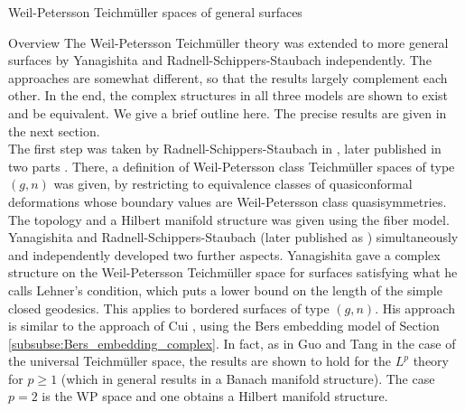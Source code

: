 \documentclass[12pt]{amsart}
\theoremstyle{plain}
\theoremstyle{definition}
\theoremstyle{remark}
\numberwithin{equation}{section} %
\numberwithin{figure}{section} %
\begin{document}
\begin{section}{Weil-Petersson Teichm\"uller spaces of general surfaces}  \label{se:WP_higher_genus} 
\begin{subsection}{Overview}
 The Weil-Petersson Teichm\"uller theory was extended to more general surfaces by Yanagishita and Radnell-Schippers-Staubach independently.  The approaches are somewhat different, so that the results largely complement each other. In the end, the complex structures in all three models are shown to exist and be equivalent. We give a brief outline here. The precise results are given in the next section. \\ 
 
 The first step was taken by Radnell-Schippers-Staubach in \cite{RSS_Filbert_arxiv}, later published in two parts \cite{RSS_Filbert1,RSS_Filbert2}.  There, a definition of Weil-Petersson class Teichm\"uller spaces of type $(g,n)$ was given, by restricting to equivalence classes of quasiconformal deformations whose boundary values are Weil-Petersson class quasisymmetries.  The topology and a Hilbert manifold structure was given using the fiber model.\\ 

 Yanagishita \cite{Yanagishita} and Radnell-Schippers-Staubach \cite{RSS_WP_arxiv} (later published as \cite{RSS_WP1,RSS_WP2})  simultaneously and independently developed two further aspects. Yanagishita gave a complex structure on the Weil-Petersson Teichm\"uller space for surfaces satisfying what he calls Lehner's condition, which puts a lower bound on the length of the simple closed geodesics.  This applies to bordered surfaces of type $(g,n)$. His approach is similar to the approach of Cui \cite{Cui}, using the Bers embedding model of Section \ref{subsubse:Bers_embedding_complex}. In fact, as in Guo \cite{GuoHui} and Tang \cite{Tang} in the case of the universal Teichm\"uller space, the results are shown to hold for the $L^p$ theory for $p\geq 1$ (which in general results in a Banach manifold structure). The case $p=2$ is the WP space and one obtains a Hilbert manifold structure. 


\end{subsection}
\end{section}
\end{document}
